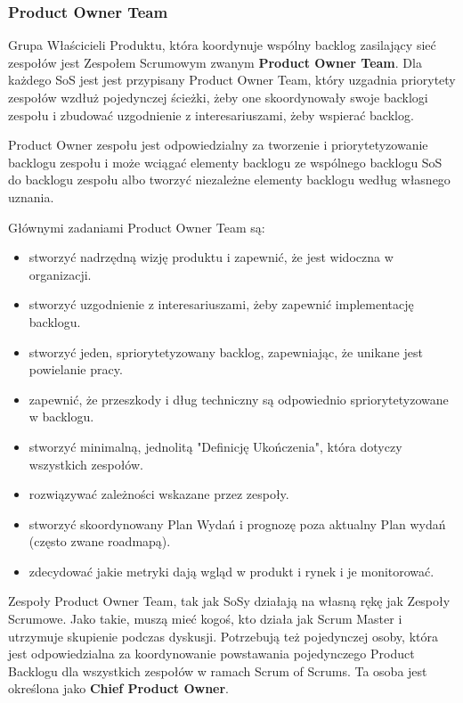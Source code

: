 \documentclass[12pt,a4paper,parskip=full]{scrartcl}
\begin{document}
\subsubsection{Product Owner Team}

Grupa Właścicieli Produktu, która koordynuje wspólny backlog zasilający sieć zespołów jest Zespołem Scrumowym zwanym \textbf{Product Owner Team}. Dla każdego SoS jest jest przypisany Product Owner Team, który uzgadnia priorytety zespołów wzdłuż pojedynczej ścieżki, żeby one skoordynowały swoje backlogi zespołu i zbudować uzgodnienie z interesariuszami, żeby wspierać backlog.

Product Owner zespołu jest odpowiedzialny za tworzenie i priorytetyzowanie backlogu zespołu i może wciągać elementy backlogu ze wspólnego backlogu SoS do backlogu zespołu albo tworzyć niezależne elementy backlogu według własnego uznania.

Głównymi zadaniami Product Owner Team są:

\begin{itemize}
	\item stworzyć nadrzędną wizję produktu i zapewnić, że jest widoczna w organizacji.
	\item stworzyć uzgodnienie z interesariuszami, żeby zapewnić implementację backlogu.
	\item stworzyć jeden, spriorytetyzowany backlog, zapewniając, że unikane jest powielanie pracy.
	\item zapewnić, że przeszkody i dług techniczny są odpowiednio spriorytetyzowane w backlogu.
	\item stworzyć minimalną, jednolitą "Definicję Ukończenia", która dotyczy wszystkich zespołów.
	\item rozwiązywać zależności wskazane przez zespoły.
	\item stworzyć skoordynowany Plan Wydań i prognozę poza aktualny Plan wydań (często zwane roadmapą).
	\item zdecydować jakie metryki dają wgląd w produkt i rynek i je monitorować.
\end{itemize}

Zespoły Product Owner Team, tak jak SoSy działają na własną rękę jak Zespoły Scrumowe. Jako takie, muszą mieć kogoś, kto działa jak Scrum Master i utrzymuje skupienie podczas dyskusji. Potrzebują też pojedynczej osoby, która jest odpowiedzialna za koordynowanie powstawania pojedynczego Product Backlogu dla wszystkich zespołów w ramach Scrum of Scrums. Ta osoba jest określona jako \textbf{Chief Product Owner}.
\end{document}
